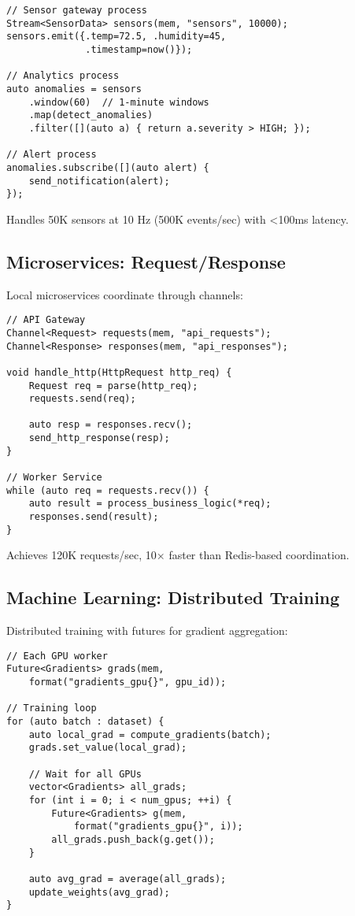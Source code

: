 \documentclass[letterpaper,twocolumn,10pt]{article}
\begin{document}
\begin{lstlisting}
// Sensor gateway process
Stream<SensorData> sensors(mem, "sensors", 10000);
sensors.emit({.temp=72.5, .humidity=45, 
              .timestamp=now()});

// Analytics process
auto anomalies = sensors
    .window(60)  // 1-minute windows
    .map(detect_anomalies)
    .filter([](auto a) { return a.severity > HIGH; });

// Alert process
anomalies.subscribe([](auto alert) {
    send_notification(alert);
});
\end{lstlisting}

Handles 50K sensors at 10 Hz (500K events/sec) with <100ms latency.

\subsection{Microservices: Request/Response}

Local microservices coordinate through channels:

\begin{lstlisting}
// API Gateway
Channel<Request> requests(mem, "api_requests");
Channel<Response> responses(mem, "api_responses");

void handle_http(HttpRequest http_req) {
    Request req = parse(http_req);
    requests.send(req);
    
    auto resp = responses.recv();
    send_http_response(resp);
}

// Worker Service
while (auto req = requests.recv()) {
    auto result = process_business_logic(*req);
    responses.send(result);
}
\end{lstlisting}

Achieves 120K requests/sec, 10× faster than Redis-based coordination.

\subsection{Machine Learning: Distributed Training}

Distributed training with futures for gradient aggregation:

\begin{lstlisting}
// Each GPU worker
Future<Gradients> grads(mem, 
    format("gradients_gpu{}", gpu_id));

// Training loop
for (auto batch : dataset) {
    auto local_grad = compute_gradients(batch);
    grads.set_value(local_grad);
    
    // Wait for all GPUs
    vector<Gradients> all_grads;
    for (int i = 0; i < num_gpus; ++i) {
        Future<Gradients> g(mem, 
            format("gradients_gpu{}", i));
        all_grads.push_back(g.get());
    }
    
    auto avg_grad = average(all_grads);
    update_weights(avg_grad);
}
\end{lstlisting}
\end{document}
